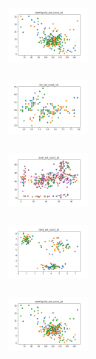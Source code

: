 \begin{figure}[H]
\begin{subfigure}
    \end{subfigure}
    \hfill
    \begin{subfigure}
        \centering
        \includegraphics[width=0.234\textwidth]{img/hs/newthyroid_set_const_10_277451237_clust.png}
    \end{subfigure}
    \hfill
    \begin{subfigure}
        \centering
        \includegraphics[width=0.234\textwidth]{img/hs/iris_set_const_10_49258669_clust.png}
    \end{subfigure}
    \hfill
    \begin{subfigure}
        \centering
        \includegraphics[width=0.234\textwidth]{img/hs/ecoli_set_const_10_49258669_clust.png}
    \end{subfigure}
    \hfill
    \begin{subfigure}
        \centering
        \includegraphics[width=0.234\textwidth]{img/hs/rand_set_const_10_49258669_clust.png}
    \end{subfigure}
    \hfill
    \begin{subfigure}
        \centering
        \includegraphics[width=0.234\textwidth]{img/hs/newthyroid_set_const_10_49258669_clust.png}
    \end{subfigure}
    \hfill
    \begin{subfigure}

\end{subfigure}
\end{figure}
